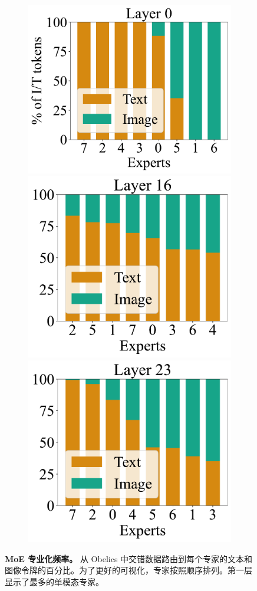 \begin{figure}[t!]
    \centering
    \captionsetup{type=figure}
    \begin{subfigure}[h]{0.95\linewidth}
    \includegraphics[height=0.27\textwidth]{assets/moes/specialization/sorted/tokens_assignment_obelics_1088_150_0.pdf}
    \includegraphics[height=0.27\textwidth]{assets/moes/specialization/sorted/tokens_assignment_obelics_1088_150_16.pdf}
    \includegraphics[height=0.27\textwidth]{assets/moes/specialization/sorted/tokens_assignment_obelics_1088_150_23.pdf}
    \end{subfigure}    \caption{\textbf{MoE 专业化频率。}
    从 Obelics 中交错数据路由到每个专家的文本和图像令牌的百分比。为了更好的可视化，专家按照顺序排列。第一层显示了最多的单模态专家。}
    \label{fig:tokens_assignment}
\end{figure}
